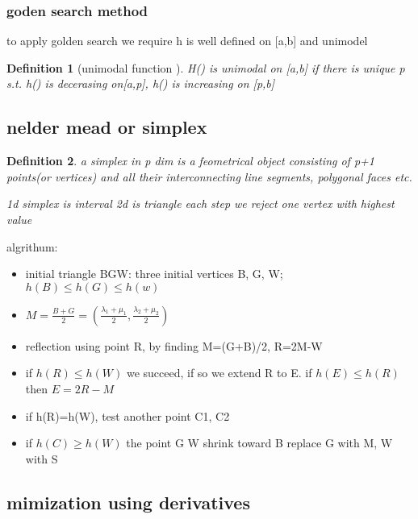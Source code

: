 \documentclass[10pt]{article}
\theoremstyle{break}
\newtheorem{defn}{Definition}[subsection]
\begin{document}
                \subsubsection{goden search method}
                to apply golden search we require h is well defined on [a,b] and unimodel 

                \begin{defn}[unimodal function ]
                    H() is unimodal on [a,b] if there is unique p s.t. 
                    h() is decerasing on[a,p], h() is increasing on [p,b]
                \end{defn}
            \subsection{nelder mead or simplex}
                \begin{defn}
                    a simplex in p dim is a feometrical object consisting of p+1 points(or vertices)
                    and all their interconnecting line segments, polygonal faces etc. 

                    1d simplex is interval 
                    2d is triangle 
                    each step we reject one vertex with highest value
                \end{defn}

                algrithum:
                \begin{itemize}
                    \item initial triangle BGW: three initial vertices B, G, W; $h(B)\leq h(G)\leq h(w)$
                    \item $M=\frac{B+G}{2}=(\frac{\lambda_1+\mu_1}{2}, \frac{\lambda_2+\mu_2}{2})$
                    \item reflection using point R, by finding M=(G+B)/2, R=2M-W
                    \item if $h(R)\leq h(W)$ we succeed, if so we extend R to E. if $h(E)\leq h(R)$ then  $E=2R-M$
                    \item if h(R)=h(W), test another point C1, C2 
                    \item if $h(C)\geq h(W)$ the point G W shrink toward B replace G with M, W with S 
                \end{itemize}
            
            \subsection{mimization using derivatives}
\end{document}
